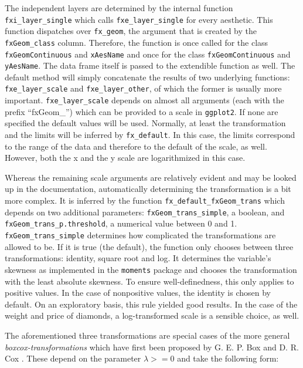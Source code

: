 \documentclass[]{report}
\theoremstyle{definition}
\theoremstyle{definition}
\theoremstyle{definition}
\theoremstyle{remark}
\begin{document}
The independent layers are determined by the internal function
\texttt{fxi\_layer\_single} which calls \texttt{fxe\_layer\_single} for
every aesthetic. This function dispatches over \texttt{fx\_geom}, the
argument that is created by the \texttt{fxGeom\_class} column.
Therefore, the function is once called for the class
\texttt{fxGeomContinuous} and \texttt{xAesName} and once for the class
\texttt{fxGeomContinuous} and \texttt{yAesName}. The data frame itself
is passed to the extendible function as well. The default method will
simply concatenate the results of two underlying functions:
\texttt{fxe\_layer\_scale} and \texttt{fxe\_layer\_other}, of which the
former is usually more important. \texttt{fxe\_layer\_scale} depends on
almost all arguments (each with the prefix ``fxGeom\_'') which can be
provided to a scale in \texttt{ggplot2}. If none are specified the
default values will be used. Normally, at least the transformation and
the limits will be inferred by \texttt{fx\_default}. In this case, the
limits correspond to the range of the data and therefore to the default
of the scale, as well. However, both the x and the y scale are
logarithmized in this case.

Whereas the remaining scale arguments are relatively evident and may be
looked up in the documentation, automatically determining the
transformation is a bit more complex. It is inferred by the function
\texttt{fx\_default\_fxGeom\_trans} which depends on two additional
parameters: \texttt{fxGeom\_trans\_simple}, a boolean, and
\texttt{fxGeom\_trans\_p.threshold}, a numerical value between 0 and 1.
\texttt{fxGeom\_trans\_simple} determines how complicated the
transformations are allowed to be. If it is true (the default), the
function only chooses between three transformations: identity, square
root and log. It determines the variable's skewness as implemented in
the \texttt{moments} package \citep{moments} and chooses the
transformation with the least absolute skewness. To ensure
well-definedness, this only applies to positive values. In the case of
nonpositive values, the identity is chosen by default. On an exploratory
basis, this rule yielded good results. In the case of the weight and
price of diamonds, a log-transformed scale is a sensible choice, as
well.

The aforementioned three transformations are special cases of the more
general \emph{boxcox-transformations} which have first been proposed by
G. E. P. Box and D. R. Cox \citeyearpar{Box1964}. These depend on the
parameter \(\lambda>=0\) and take the following form:
\end{document}

